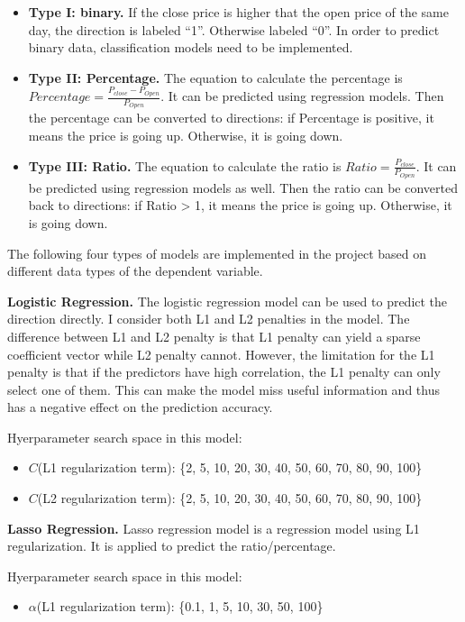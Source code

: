 \documentclass[letterpaper]{article}
\begin{document}
\begin{itemize}
  \item \textbf{Type I: binary.} If the close price is higher that the open
    price of the same day, the direction is labeled “1”. Otherwise labeled “0”.
    In order to predict binary data, classification models need to be
    implemented.
  \item \textbf{Type II: Percentage.} The equation to calculate the percentage
    is $Percentage = \frac {P_{close} - P_{Open}} {P_{Open}}$. It can be
    predicted using regression models. Then the percentage can be converted to
    directions: if Percentage is positive, it means the price is going up.
    Otherwise, it is going down.
  \item \textbf{Type III: Ratio.} The equation to calculate the ratio is
    $Ratio = \frac {P_{close}} {P_{Open}}$. It can be predicted using
    regression models as well. Then the ratio can be converted back to
    directions: if Ratio > 1, it means the price is going up.
    Otherwise, it is going down.
\end{itemize}

The following four types of models are implemented in the project based on
different data types of the dependent variable.

\textbf{Logistic Regression.} The logistic regression model can be used to
predict the direction directly. I consider both L1 and L2 penalties in the
model. The difference between L1 and L2 penalty is that L1 penalty can yield a
sparse coefficient vector while L2 penalty cannot. However, the limitation for
the L1 penalty is that if the predictors have high correlation, the L1 penalty
can only select one of them. This can make the model miss useful information
and thus has a negative effect on the prediction accuracy.

Hyerparameter search space in this model:
\begin{itemize}
  \item $C$(L1 regularization term): \{2, 5, 10, 20, 30, 40, 50, 60, 70, 80,
    90, 100\}
  \item $C$(L2 regularization term): \{2, 5, 10, 20, 30, 40, 50, 60, 70, 80,
    90, 100\}
\end{itemize}

\textbf{Lasso Regression.} Lasso regression model is a regression model using
L1 regularization. It is applied to predict the ratio/percentage.

Hyerparameter search space in this model:
\begin{itemize}
  \item $\alpha$(L1 regularization term): \{0.1, 1, 5, 10, 30, 50, 100\}
\end{itemize}
\end{document}
